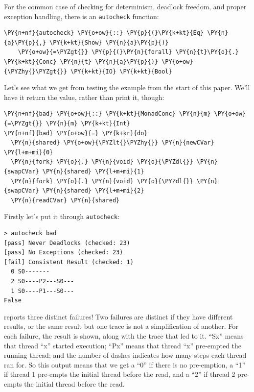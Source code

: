 For the common case of checking for determinism, deadlock freedom, and
proper exception handling, there is an \texttt{autocheck} function:


\begin{Verbatim}[commandchars=\\\{\}]
\PY{n+nf}{autocheck} \PY{o+ow}{::} \PY{p}{(}\PY{k+kt}{Eq} \PY{n}{a}\PY{p}{,} \PY{k+kt}{Show} \PY{n}{a}\PY{p}{)}
    \PY{o+ow}{=\PYZgt{}} \PY{p}{(}\PY{n}{forall} \PY{n}{t}\PY{o}{.} \PY{k+kt}{Conc} \PY{n}{t} \PY{n}{a}\PY{p}{)} \PY{o+ow}{\PYZhy{}\PYZgt{}} \PY{k+kt}{IO} \PY{k+kt}{Bool}
\end{Verbatim}

Let's see what we get from testing the example from the start of this
paper. We'll have it return the value, rather than print it, though:


\begin{Verbatim}[commandchars=\\\{\}]
\PY{n+nf}{bad} \PY{o+ow}{::} \PY{k+kt}{MonadConc} \PY{n}{m} \PY{o+ow}{=\PYZgt{}} \PY{n}{m} \PY{k+kt}{Int}
\PY{n+nf}{bad} \PY{o+ow}{=} \PY{k+kr}{do}
  \PY{n}{shared} \PY{o+ow}{\PYZlt{}\PYZhy{}} \PY{n}{newCVar} \PY{l+m+mi}{0}
  \PY{n}{fork} \PY{o}{.} \PY{n}{void} \PY{o}{\PYZdl{}} \PY{n}{swapCVar} \PY{n}{shared} \PY{l+m+mi}{1}
  \PY{n}{fork} \PY{o}{.} \PY{n}{void} \PY{o}{\PYZdl{}} \PY{n}{swapCVar} \PY{n}{shared} \PY{l+m+mi}{2}
  \PY{n}{readCVar} \PY{n}{shared}
\end{Verbatim}

Firstly let's put it through \texttt{autocheck}:

\begin{verbatim}
> autocheck bad
[pass] Never Deadlocks (checked: 23)
[pass] No Exceptions (checked: 23)
[fail] Consistent Result (checked: 1)
  0 S0-------
  2 S0----P2---S0---
  1 S0----P1---S0---
False
\end{verbatim}

\dejafu{} reports three distinct failures! Two failures are distinct
if they have different results, or the same result but one trace is
not a simplification of another. For each failure, the result is
shown, along with the trace that led to it. ``Sx'' means that thread
``x'' started execution; ``Px'' means that thread ``x'' pre-empted the
running thread; and the number of dashes indicates how many steps each
thread ran for. So this output means that we get a ``0'' if there is
no pre-emption, a ``1'' if thread 1 pre-empts the initial thread
before the read, and a ``2'' if thread 2 pre-empts the initial thread
before the read.

